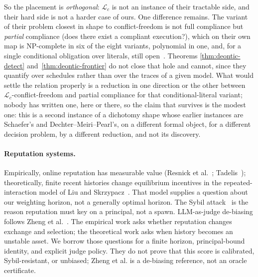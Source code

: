 \documentclass[11pt,a4paper]{article}
\theoremstyle{definition}
\theoremstyle{definition}
\theoremstyle{remark}
\begin{document}
So the placement is \emph{orthogonal}: $\mathcal{L}_c$ is not an instance of
their tractable side, and their hard side is not a harder case of ours. One
difference remains. The variant of their problem
closest in shape to conflict-freedom is not full compliance but \emph{partial}
compliance (does there exist a compliant execution?), which on their own map
is NP-complete in six of the eight variants, polynomial in one, and, for a single
conditional obligation over literals, still open~. Theorems
\ref{thm:deontic-detect} and~\ref{thm:deontic-frontier} do not close that hole
and cannot, since they quantify over schedules rather than over the traces of a
given model. What would settle the relation properly is a reduction in one
direction or the other between $\mathcal{L}_c$-conflict-freedom and partial
compliance for that conditional-literal variant; nobody has written one, here or
there, so the claim that survives is the modest one: this is a second
instance of a dichotomy shape whose earlier instances are Schaefer's and
Dechter--Meiri--Pearl's, on a different formal object, for a different decision
problem, by a different reduction, and not its discovery.


\paragraph{Reputation systems.} Empirically, online reputation has measurable value
(Resnick et al.~; Tadelis~); theoretically,
finite recent histories change equilibrium incentives in the repeated-interaction
model of Liu and Skrzypacz~. That model supplies a question about
our weighting horizon, not a generally optimal horizon. The Sybil
attack~ is the reason reputation must key on a principal, not a
spawn. LLM-as-judge de-biasing follows Zheng et al.~.
The empirical work asks whether reputation changes exchange and selection; the
theoretical work asks when history becomes an unstable asset. We borrow those
questions for a finite horizon, principal-bound identity, and explicit judge
policy. They do not prove that this score is calibrated, Sybil-resistant, or
unbiased; Zheng et al. is a de-biasing reference, not an oracle certificate.
\end{document}
